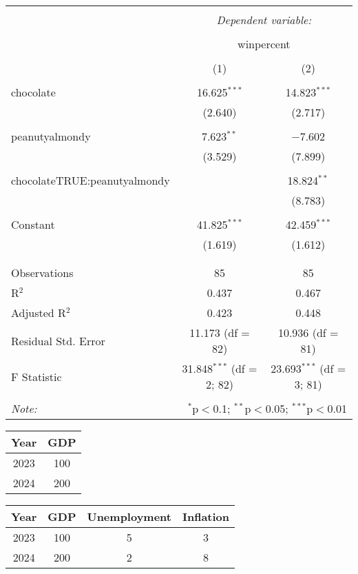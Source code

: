 \documentclass[a4paper,landscape]{article}
\begin{document}
\begin{table}[!htbp] \centering 
   \caption{} 
   \label{} 
 \begin{tabular}{@{\extracolsep{5pt}}lcc} 
 \\[-1.8ex]\hline 
 \hline \\[-1.8ex] 
  & \multicolumn{2}{c}{\textit{Dependent variable:}} \\ 
 \cline{2-3} 
 \\[-1.8ex] & \multicolumn{2}{c}{winpercent} \\ 
 \\[-1.8ex] & (1) & (2)\\ 
 \hline \\[-1.8ex] 
  chocolate & 16.625$^{***}$ & 14.823$^{***}$ \\ 
   & (2.640) & (2.717) \\ 
   & & \\ 
  peanutyalmondy & 7.623$^{**}$ & $-$7.602 \\ 
   & (3.529) & (7.899) \\ 
   & & \\ 
  chocolateTRUE:peanutyalmondy &  & 18.824$^{**}$ \\ 
   &  & (8.783) \\ 
   & & \\ 
  Constant & 41.825$^{***}$ & 42.459$^{***}$ \\ 
   & (1.619) & (1.612) \\ 
   & & \\ 
 \hline \\[-1.8ex] 
 Observations & 85 & 85 \\ 
 R$^{2}$ & 0.437 & 0.467 \\ 
 Adjusted R$^{2}$ & 0.423 & 0.448 \\ 
 Residual Std. Error & 11.173 (df = 82) & 10.936 (df = 81) \\ 
 F Statistic & 31.848$^{***}$ (df = 2; 82) & 23.693$^{***}$ (df = 3; 81) \\ 
 \hline 
 \hline \\[-1.8ex] 
 \textit{Note:}  & \multicolumn{2}{r}{$^{*}$p$<$0.1; $^{**}$p$<$0.05; $^{***}$p$<$0.01} \\ 
 \end{tabular} 
\end{table}



\break


\begin{center}
    \begin{tabular}{| c | c |}
        \hline
            Year & GDP \\
        \hline 
            2023 & 100 \\
        \hline 
            2024 & 200 \\
        \hline
    \end{tabular}
\end{center}



\begin{center}
    \begin{tabular}{| c | c  c  c|}
        \hline
            Year & GDP & Unemployment & Inflation\\
        \hline 
            2023 & 100 & 5 & 3 \\
        \hline 
            2024 & 200 & 2 & 8\\
        \hline
    \end{tabular}
\end{center}



 
\end{document}
